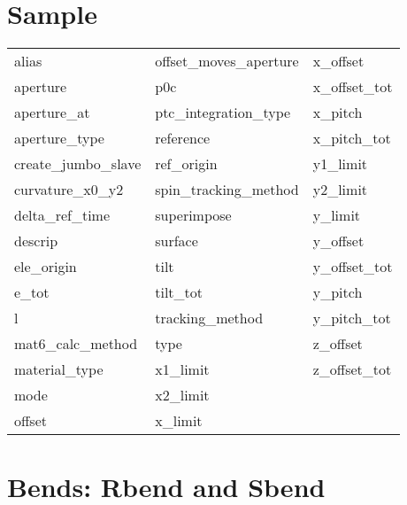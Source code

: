  \section{Sample}
 \label{s:list.sample}
 
 \begin{tabular}{lll} \toprule
alias                       & offset_moves_aperture       & x_offset                    \\
aperture                    & p0c                         & x_offset_tot                \\
aperture_at                 & ptc_integration_type        & x_pitch                     \\
aperture_type               & reference                   & x_pitch_tot                 \\
create_jumbo_slave          & ref_origin                  & y1_limit                    \\
curvature_x0_y2             & spin_tracking_method        & y2_limit                    \\
delta_ref_time              & superimpose                 & y_limit                     \\
descrip                     & surface                     & y_offset                    \\
ele_origin                  & tilt                        & y_offset_tot                \\
e_tot                       & tilt_tot                    & y_pitch                     \\
l                           & tracking_method             & y_pitch_tot                 \\
mat6_calc_method            & type                        & z_offset                    \\
material_type               & x1_limit                    & z_offset_tot                \\
mode                        & x2_limit                    &                             \\
offset                      & x_limit                     &                             \\
 \bottomrule
 \end{tabular}
 \vfill
 
 \section{Bends: Rbend and Sbend}
 \label{s:list.bend}
 
